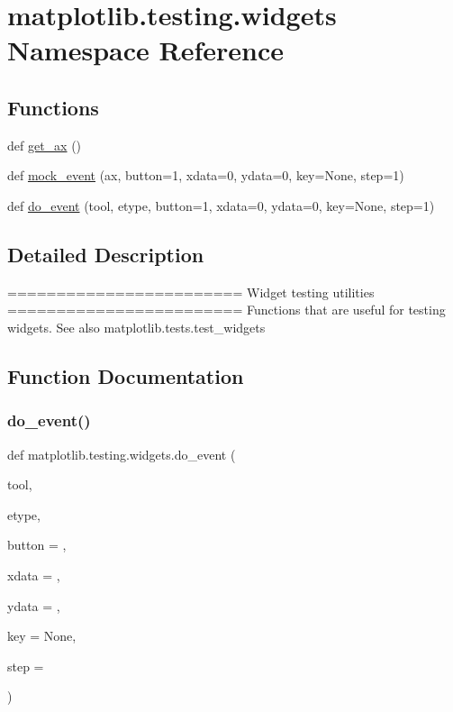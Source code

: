 \hypertarget{namespacematplotlib_1_1testing_1_1widgets}{}\section{matplotlib.\+testing.\+widgets Namespace Reference}
\label{namespacematplotlib_1_1testing_1_1widgets}
\subsection*{Functions}
\begin{DoxyCompactItemize}
\item 
def \hyperlink{namespacematplotlib_1_1testing_1_1widgets_aedcccd23785f9a7f802bc4aa32cd62eb}{get\+\_\+ax} ()
\item 
def \hyperlink{namespacematplotlib_1_1testing_1_1widgets_ac13ed6feeaf8edc9195366861e34b60d}{mock\+\_\+event} (ax, button=1, xdata=0, ydata=0, key=None, step=1)
\item 
def \hyperlink{namespacematplotlib_1_1testing_1_1widgets_ab52523b67821cc7ed7921237de6d32f0}{do\+\_\+event} (tool, etype, button=1, xdata=0, ydata=0, key=None, step=1)
\end{DoxyCompactItemize}


\subsection{Detailed Description}
\begin{DoxyVerb}========================
Widget testing utilities
========================
Functions that are useful for testing widgets.
See also matplotlib.tests.test_widgets
\end{DoxyVerb}
 

\subsection{Function Documentation}
\mbox{\label{namespacematplotlib_1_1testing_1_1widgets_ab52523b67821cc7ed7921237de6d32f0}} 
\subsubsection{\texorpdfstring{do\+\_\+event()}{do\_event()}}
{\footnotesize\ttfamily def matplotlib.\+testing.\+widgets.\+do\+\_\+event (\begin{DoxyParamCaption}\item[{}]{tool,  }\item[{}]{etype,  }\item[{}]{button = {},  }\item[{}]{xdata = {},  }\item[{}]{ydata = {},  }\item[{}]{key = {\ttfamily None},  }\item[{}]{step = {} }\end{DoxyParamCaption})}

